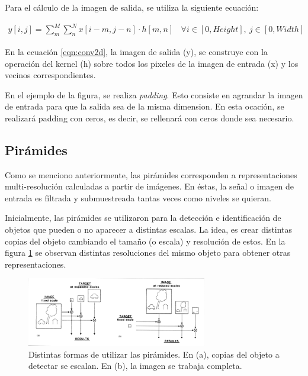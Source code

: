 \documentclass[12pt, letterpaper]{article}
\begin{document}
\par Para el cálculo de la imagen de salida, se utiliza la siguiente ecuación:

\begin{align}
  y[i,j] = \sum_{m}^{M} \sum_{n}^{N} x[i-m, j-n] \cdot h[m,n] \: \: \: \: \forall i \in [0,Height], \: j \in [0,Width]
  \label{eqn:conv2d}
\end{align}

\par En la ecuación \ref{eqn:conv2d}, la imagen de salida (y), se construye con la operación del kernel (h) sobre todos los pixeles de la imagen de entrada (x) y los vecinos correspondientes.

\par En el ejemplo de la figura, se realiza \textit{padding}. Esto consiste en agrandar la imagen de entrada para que la salida sea de la misma dimension. En esta ocación, se realizará padding con ceros, es decir, se rellenará con ceros donde sea necesario.

\subsection{Pirámides}
Como se menciono anteriormente, las pirámides corresponden a representaciones multi-resolución calculadas a partir de imágenes. En éstas, la señal o imagen de entrada es filtrada y submuestreada tantas veces como niveles se quieran.


\par Inicialmente, las pirámides se utilizaron para la detección e identificación de objetos que pueden o no aparecer a distintas escalas. La idea, es crear distintas copias del objeto cambiando el tamaño (o escala) y resolución de estos. En la figura \ref{fig:pyramidPaper} se observan distintas resoluciones del mismo objeto para obtener otras representaciones.

\begin{figure}[H]
  \centering
  \includegraphics[width = 0.7\textwidth]{pyramid_paper.png}
  \caption{Distintas formas de utilizar las pirámides. En (a), copias del objeto a detectar se escalan. En (b), la imagen se trabaja completa. \cite{paperPyramids}}
  \label{fig:pyramidPaper}
\end{figure}
\end{document}
